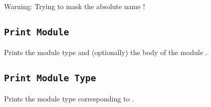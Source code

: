 \begin{ErrMsgs}
  \item {}
\end{ErrMsgs}
\begin{Warnings}
  \item Warning: Trying to mask the absolute name {\qualid} !
\end{Warnings}

\subsection{\tt Print Module {\ident}}
Prints the module type and (optionally) the body of the module {\ident}.

\subsection{\tt Print Module Type {\ident}}
Prints the module type corresponding to {\ident}.


